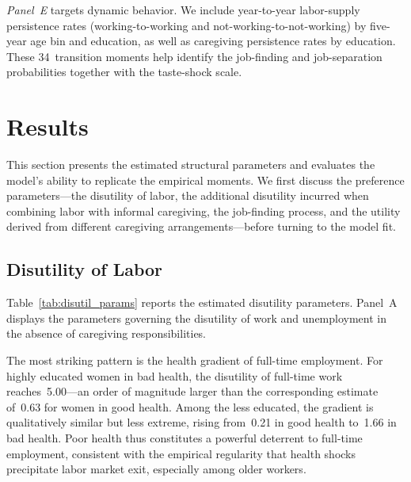\textit{Panel~E} targets dynamic behavior.  We include year-to-year
labor-supply persistence rates (working-to-working and
not-working-to-not-working) by five-year age bin and education, as well as
caregiving persistence rates by education.  These 34~transition moments help
identify the job-finding and job-separation probabilities together with the
taste-shock scale.




\section{Results}
\label{sec:results}

This section presents the estimated structural parameters and evaluates the
model's ability to replicate the empirical moments.  We first discuss the
preference parameters---the disutility of labor, the additional disutility
incurred when combining labor with informal caregiving, the job-finding
process, and the utility derived from different caregiving
arrangements---before turning to the model fit.


\subsection{Disutility of Labor}
\label{sec:results_disutil}

Table~\ref{tab:disutil_params} reports the estimated disutility parameters.
Panel~A displays the parameters governing the disutility of work and
unemployment in the absence of caregiving responsibilities.

The most striking pattern is the health gradient of full-time employment.
For highly educated women in bad health, the disutility of full-time work
reaches~5.00---an order of magnitude larger than the corresponding
estimate of~0.63 for women in good health.  Among the less educated, the
gradient is qualitatively similar but less extreme, rising from~0.21 in
good health to~1.66 in bad health.  Poor health thus constitutes a
powerful deterrent to full-time employment, consistent with the empirical
regularity that health shocks precipitate labor market exit, especially
among older workers.

